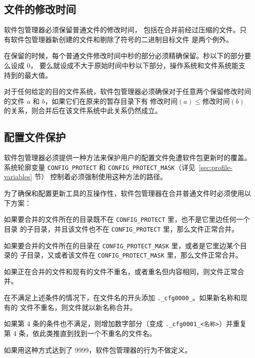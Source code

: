 \subsection{文件的修改时间}

软件包管理器必须保留普通文件的修改时间，
包括在合并前经过压缩的文件。只有软件包管理器新创建的文件和剔除了符号的二进制目标文件
是两个例外。

在保留的时候，每个普通文件修改时间中秒的部分必须精确保留。秒以下的部分要么设成 0，
要么就设成不大于原始时间中秒以下部分，操作系统和文件系统能支持到的最大值。

对于任何给定的目的文件系统，软件包管理器必须确保对于任意两个保留修改时间的文件 $a$
和 $b$，如果它们在原来的暂存目录下有 $\mbox{修改时间}(a) \leq \mbox{修改时间}(b)$
的关系，则合并后在该文件系统中此关系仍然成立。

\subsection{配置文件保护}
\label{sec:config-protect}

软件包管理器必须提供一种方法来保护用户的配置文件免遭软件包更新时的覆盖。系统轮廓变量
\texttt{CONFIG_PROTECT} 和 \texttt{CONFIG_PROTECT_MASK}（详见~\ref{sec:profile-variables} 节）
控制着必须强制使用这种方法的路径。

为了确保和配置更新工具的互操作性，软件包管理器在合并普通文件时必须使用以下方案：

\begin{compactenum}
\item 如果要合并的文件所在的目录既不在 \texttt{CONFIG_PROTECT} 里，也不是它里边任何一个目录
    的子目录，并且该文件也不在 \texttt{CONFIG_PROTECT} 里，那么文件正常合并。
\item 如果要合并的文件所在的目录在 \texttt{CONFIG_PROTECT_MASK} 里，或者是它里边某个目录的
    子目录，又或者该文件在 \texttt{CONFIG_PROTECT_MASK} 里，那么文件正常合并。
\item 如果正在合并的文件和现有的文件不重名，或者重名但内容相同，则文件正常合并。
\item 在不满足上述条件的情况下，在文件名的开头添加 \texttt{._cfg0000_}。如果新名称和现有的
    文件不重名，则文件就以新名称合并。
\item 如果第 4 条的条件也不满足，则增加数字部分（变成 \texttt{._cfg0001_<\hspace{0em}名称\hspace{0em}>}）并重复
    第 4 条，依此类推直到找到一个不重名的文件名。
\item 如果用这种方式达到了 9999，软件包管理器的行为不做定义。
\end{compactenum}

